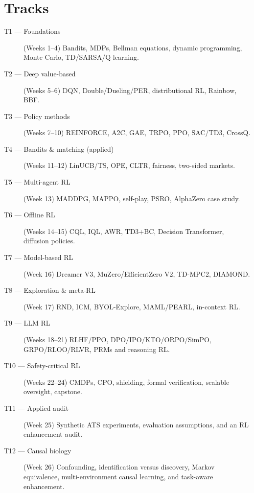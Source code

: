 \documentclass[11pt,oneside]{scrbook}
\begin{document}
\section{Tracks}
\begin{description}
  \item[T1 — Foundations] (Weeks 1--4) Bandits, MDPs, Bellman equations, dynamic programming, Monte Carlo, TD/SARSA/Q-learning.
  \item[T2 — Deep value-based] (Weeks 5--6) DQN, Double/Dueling/PER, distributional RL, Rainbow, BBF.
  \item[T3 — Policy methods] (Weeks 7--10) REINFORCE, A2C, GAE, TRPO, PPO, SAC/TD3, CrossQ.
  \item[T4 — Bandits \& matching (applied)] (Weeks 11--12) LinUCB/TS, OPE, CLTR, fairness, two-sided markets.
  \item[T5 — Multi-agent RL] (Week 13) MADDPG, MAPPO, self-play, PSRO, AlphaZero case study.
  \item[T6 — Offline RL] (Weeks 14--15) CQL, IQL, AWR, TD3+BC, Decision Transformer, diffusion policies.
  \item[T7 — Model-based RL] (Week 16) Dreamer V3, MuZero/EfficientZero V2, TD-MPC2, DIAMOND.
  \item[T8 — Exploration \& meta-RL] (Week 17) RND, ICM, BYOL-Explore, MAML/PEARL, in-context RL.
  \item[T9 — LLM RL] (Weeks 18--21) RLHF/PPO, DPO/IPO/KTO/ORPO/SimPO, GRPO/RLOO/RLVR, PRMs and reasoning RL.
  \item[T10 — Safety-critical RL] (Weeks 22--24) CMDPs, CPO, shielding, formal verification, scalable oversight, capstone.
  \item[T11 --- Applied audit] (Week 25) Synthetic ATS experiments, evaluation assumptions, and an RL enhancement audit.
  \item[T12 --- Causal biology] (Week 26) Confounding, identification versus discovery, Markov equivalence, multi-environment causal learning, and task-aware enhancement.
\end{description}
\end{document}
